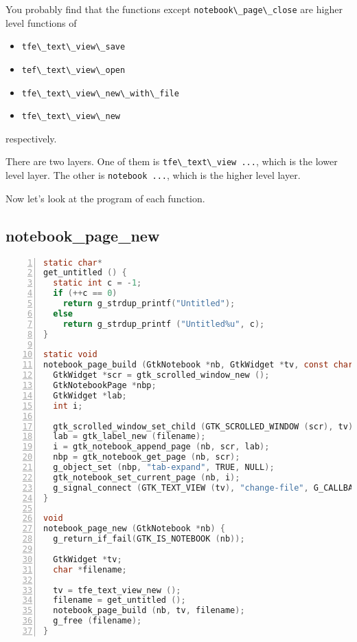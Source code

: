 You probably find that the functions except
\passthrough{\lstinline!notebook\_page\_close!} are higher level
functions of

\begin{itemize}
\tightlist
\item
  \passthrough{\lstinline!tfe\_text\_view\_save!}
\item
  \passthrough{\lstinline!tef\_text\_view\_open!}
\item
  \passthrough{\lstinline!tfe\_text\_view\_new\_with\_file!}
\item
  \passthrough{\lstinline!tfe\_text\_view\_new!}
\end{itemize}

respectively.

There are two layers. One of them is
\passthrough{\lstinline!tfe\_text\_view ...!}, which is the lower level
layer. The other is \passthrough{\lstinline!notebook ...!}, which is the
higher level layer.

Now let's look at the program of each function.

\subsection{notebook\_page\_new}\label{notebook_page_new}

\begin{lstlisting}[language=C, numbers=left]
static char*
get_untitled () {
  static int c = -1;
  if (++c == 0) 
    return g_strdup_printf("Untitled");
  else
    return g_strdup_printf ("Untitled%u", c);
}

static void
notebook_page_build (GtkNotebook *nb, GtkWidget *tv, const char *filename) {
  GtkWidget *scr = gtk_scrolled_window_new ();
  GtkNotebookPage *nbp;
  GtkWidget *lab;
  int i;

  gtk_scrolled_window_set_child (GTK_SCROLLED_WINDOW (scr), tv);
  lab = gtk_label_new (filename);
  i = gtk_notebook_append_page (nb, scr, lab);
  nbp = gtk_notebook_get_page (nb, scr);
  g_object_set (nbp, "tab-expand", TRUE, NULL);
  gtk_notebook_set_current_page (nb, i);
  g_signal_connect (GTK_TEXT_VIEW (tv), "change-file", G_CALLBACK (file_changed_cb), nb);
}

void
notebook_page_new (GtkNotebook *nb) {
  g_return_if_fail(GTK_IS_NOTEBOOK (nb));

  GtkWidget *tv;
  char *filename;

  tv = tfe_text_view_new ();
  filename = get_untitled ();
  notebook_page_build (nb, tv, filename);
  g_free (filename);
}
\end{lstlisting}

